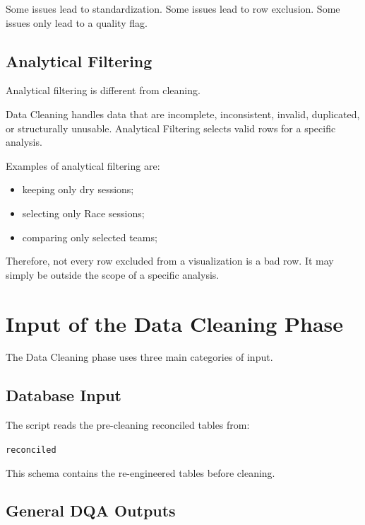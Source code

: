 \documentclass[a4paper,11pt]{article}
\begin{document}
	Some issues lead to standardization.
	Some issues lead to row exclusion.
	Some issues only lead to a quality flag.

	
	\subsection{Analytical Filtering}
	
	Analytical filtering is different from cleaning.
	
	Data Cleaning handles data that are incomplete, inconsistent, invalid, duplicated, or structurally unusable.
	Analytical Filtering selects valid rows for a specific analysis.
	
	Examples of analytical filtering are:
	
	\begin{itemize}[leftmargin=1.2cm]
		\item keeping only dry sessions;
		\item selecting only Race sessions;
		\item comparing only selected teams;
	\end{itemize}
	
	Therefore, not every row excluded from a visualization is a bad row.
	It may simply be outside the scope of a specific analysis.
	
	\section{Input of the Data Cleaning Phase}
	
	The Data Cleaning phase uses three main categories of input.
	
	\subsection{Database Input}
	
	The script reads the pre-cleaning reconciled tables from:
	
	\begin{center}
		\texttt{reconciled}
	\end{center}
	
	This schema contains the re-engineered tables before cleaning.
	
	\subsection{General DQA Outputs}
	
\end{document}
